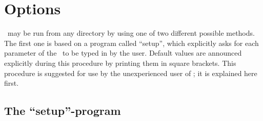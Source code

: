 %
%

\section{Options}\label{genesis-opt}

\GEN\ may be run from any directory by using one of two different 
possible methods.
The first one is based on a program called ``setup'', which explicitly
asks for each parameter of the \GA\ to be typed in by the user.
Default values are announced explicitly during this procedure by
printing them in square brackets.
This procedure is suggested for use by the unexperienced user of \GEN;
it is explained here first.

\subsection{The ``setup''-program}

